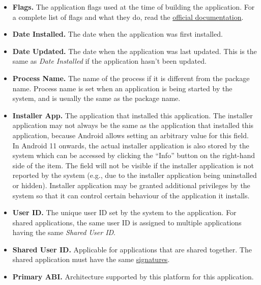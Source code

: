 \begin{itemize}
\begin{itemize}
        \item \textbf{Flags.} The application flags used at the time of building the application. For a complete list of
        flags and what they do, read the
        \href{https://developer.android.com/reference/android/content/pm/ApplicationInfo\#flags}{official documentation}.

        \item \textbf{Date Installed.} The date when the application was first installed.

        \item \textbf{Date Updated.} The date when the application was last updated. This is the same as \textit{Date Installed}
        if the application hasn't been updated.

        \item \textbf{Process Name.} The name of the process if it is different from the package
        name. Process name is set when an application is being started by the system, and is usually
        the same as the package name.

        \item \textbf{Installer App.} The application that installed this application. The installer
        application may not always be the same as the application that installed this application,
        because Android allows setting an arbitrary value for this field. In Android 11 onwards, the
        actual installer application is also stored by the system which can be accessed by clicking
        the ``Info'' button on the right-hand side of the item. The field will not be visible if the
        installer application is not reported by the system (e.g., due to the installer application
        being uninstalled or hidden). Installer application may be granted additional privileges by
        the system so that it can control certain behaviour of the application it installs.

        \item \textbf{User ID.} The unique user ID set by the system to the application. For shared
        applications, the same user ID is assigned to multiple applications having the same
        \textit{Shared User ID}.

        \item \textbf{Shared User ID.} Applicable for applications that are shared together. The shared application must
        have the same \hyperref[subsec:signatures-tab]{signatures}.

        \item \textbf{Primary ABI.} Architecture supported by this platform for this application.


\end{itemize}
\end{itemize}
